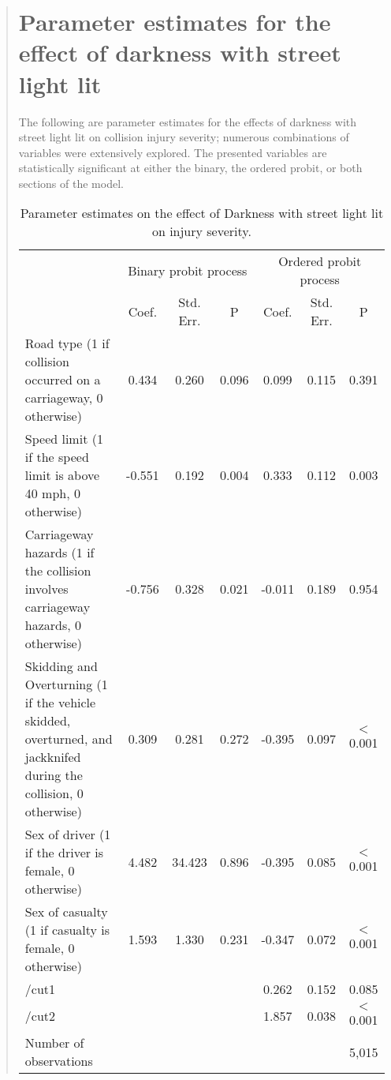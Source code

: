 \documentclass[12]{report}
\begin{document}
\begin{quote}
{\section{Parameter estimates for the effect of darkness with street light lit}

The following are parameter estimates for the effects of darkness with street light lit on collision injury severity; numerous combinations of variables were extensively explored.
The presented variables are statistically significant at either the binary, the ordered probit, or both sections of the model.

\begin{table}[H]
\renewcommand{\arraystretch}{1.4}
\centering
\caption{Parameter estimates on the effect of Darkness with street light lit on injury severity.}
\begin{tabular}{p{10.4cm} ccc ccc}
\toprule
 & \multicolumn{3}{c}{Binary probit process} & \multicolumn{3}{c}{Ordered probit process} \\
\cmidrule(r){2-4} \cmidrule(r){5-7}
& Coef. & Std. Err. & P & Coef. & Std. Err. & P \\
\midrule
Road type (1 if collision occurred on a carriageway, 0 otherwise) & 0.434 & 0.260 & 0.096 & 0.099 & 0.115 & 0.391 \\

Speed limit (1 if the speed limit is above 40 mph, 0 otherwise) & -0.551 & 0.192 & 0.004 & 0.333 & 0.112 & 0.003 \\

Carriageway hazards (1 if the collision involves carriageway hazards, 0 otherwise) & -0.756 & 0.328 & 0.021 & -0.011 & 0.189 & 0.954 \\

Skidding and Overturning (1 if the vehicle skidded, overturned, and jackknifed during the collision, 0 otherwise) & 0.309 & 0.281 & 0.272 & -0.395 & 0.097 & $<$ 0.001 \\

Sex of driver (1 if the driver is female, 0 otherwise) & 4.482 & 34.423 & 0.896 & -0.395 & 0.085 & $<$ 0.001\\

Sex of casualty (1 if casualty is female, 0 otherwise) & 1.593 & 1.330 & 0.231 & -0.347 & 0.072 & $<$ 0.001\\
\midrule
/cut1 & & & & 0.262 & 0.152 & 0.085 \\
/cut2 & & & & 1.857 & 0.038 & $<$ 0.001 \\
Number of observations & & & & && 5,015\\
\bottomrule
\end{tabular}
\end{table}

}
\end{quote}
\end{document}
